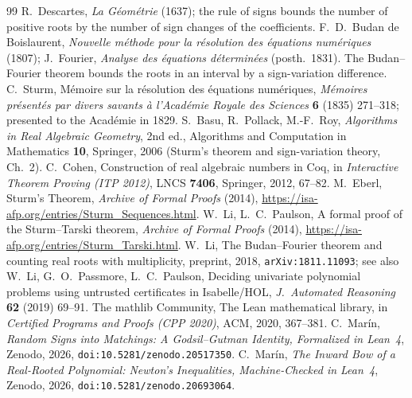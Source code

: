\documentclass[11pt]{article}
\begin{document}
\begin{thebibliography}{99}\small
{} R.~Descartes, \emph{La G\'eom\'etrie} (1637); the rule of signs bounds the
number of positive roots by the number of sign changes of the coefficients.
 F.~D.~Budan de Boislaurent, \emph{Nouvelle m\'ethode pour la r\'esolution des
\'equations num\'eriques} (1807); J.~Fourier, \emph{Analyse des \'equations d\'etermin\'ees}
(posth.\ 1831). The Budan--Fourier theorem bounds the roots in an interval by a sign-variation
difference.
 C.~Sturm, M\'emoire sur la r\'esolution des \'equations num\'eriques,
\emph{M\'emoires pr\'esent\'es par divers savants \`a l'Acad\'emie Royale des Sciences} \textbf{6}
(1835) 271--318; presented to the Acad\'emie in 1829.
 S.~Basu, R.~Pollack, M.-F.~Roy, \emph{Algorithms in Real Algebraic Geometry}, 2nd
ed., Algorithms and Computation in Mathematics \textbf{10}, Springer, 2006 (Sturm's theorem and
sign-variation theory, Ch.~2).
 C.~Cohen, Construction of real algebraic numbers in Coq, in \emph{Interactive
Theorem Proving (ITP 2012)}, LNCS \textbf{7406}, Springer, 2012, 67--82.
 M.~Eberl, Sturm's Theorem, \emph{Archive of Formal Proofs} (2014),
\url{https://isa-afp.org/entries/Sturm_Sequences.html}.
 W.~Li, L.~C.~Paulson, A formal proof of the Sturm--Tarski theorem,
\emph{Archive of Formal Proofs} (2014), \url{https://isa-afp.org/entries/Sturm_Tarski.html}.
 W.~Li, The Budan--Fourier theorem and counting real roots with multiplicity,
preprint, 2018, \texttt{arXiv:1811.11093}; see also W.~Li, G.~O.~Passmore, L.~C.~Paulson, Deciding
univariate polynomial problems using untrusted certificates in Isabelle/HOL, \emph{J.~Automated
Reasoning} \textbf{62} (2019) 69--91.
 The mathlib Community, The Lean mathematical library, in \emph{Certified Programs
and Proofs (CPP 2020)}, ACM, 2020, 367--381.
 C.~Mar\'in, \emph{Random Signs into Matchings: A Godsil--Gutman Identity,
Formalized in Lean~4}, Zenodo, 2026, \texttt{doi:10.5281/zenodo.20517350}.
 C.~Mar\'in, \emph{The Inward Bow of a Real-Rooted Polynomial: Newton's
Inequalities, Machine-Checked in Lean~4}, Zenodo, 2026, \texttt{doi:10.5281/zenodo.20693064}.
\end{thebibliography}
\end{document}
